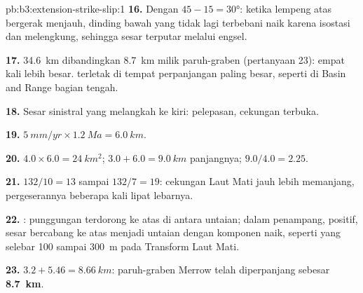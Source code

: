 \begin{solution}{pb:b3:extension-strike-slip:1}
\textbf{16.} Dengan $45 - 15 = \ang{30}$: ketika lempeng atas bergerak menjauh,
dinding bawah yang tidak lagi terbebani naik karena isostasi dan melengkung,
sehingga sesar terputar melalui engsel.

\textbf{17.} \qty{34.6}{km} dibandingkan \qty{8.7}{km} milik paruh-graben (pertanyaan
23): empat kali lebih besar.  terletak di tempat
perpanjangan paling besar, seperti di Basin and Range bagian tengah.

\textbf{18.} Sesar sinistral yang melangkah ke kiri: pelepasan, cekungan terbuka.

\textbf{19.} $\qty{5}{mm/yr}\times\qty{1.2}{Ma} = \qty{6.0}{km}$.

\textbf{20.} $4.0\times6.0 = \qty{24}{km^2}$; $3.0 + 6.0 = \qty{9.0}{km}$ panjangnya;
$9.0/4.0 = 2.25$.

\textbf{21.} $132/10 = 13$ sampai $132/7 = 19$: cekungan Laut Mati jauh lebih
memanjang, pergeserannya beberapa kali lipat lebarnya.

\textbf{22.} : punggungan terdorong ke atas di antara untaian; dalam
penampang,  positif, sesar bercabang ke atas menjadi untaian
dengan komponen naik, seperti yang selebar 100 sampai \qty{300}{m} pada Transform
Laut Mati.

\textbf{23.} $3.2 + 5.46 = \qty{8.66}{km}$: paruh-graben Merrow telah
diperpanjang sebesar \textbf{\qty[text-series-to-math=true]{8.7}{km}}.
\end{solution}
